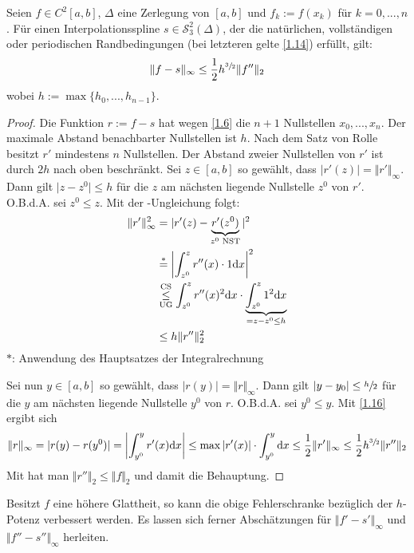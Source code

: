 \begin{proposition}
	Seien $f\in C^2[a,b]$, $\Delta$ eine Zerlegung von $[a,b]$ und $f_k:=f(x_k)$ für $k=0,...,n$. Für einen Interpolationsspline $s\in\mathcal{S}^2_3(\Delta)$, der die natürlichen, vollständigen oder periodischen Randbedingungen (bei letzteren gelte \cref{1.14}) erfüllt, gilt:
	\begin{align}
		\Vert f-s\Vert_\infty \le \frac{1}{2}h^{\sfrac{3}{2}}\Vert f''\Vert_2\notag
	\end{align}
	wobei $h:=\max\{h_0,...,h_{n-1}\}$.
\end{proposition}
\begin{proof}
	Die Funktion $r:=f-s$ hat wegen \cref{1.6} die $n+1$ Nullstellen $x_0,...,x_n$. Der maximale Abstand benachbarter Nullstellen ist $h$. Nach dem Satz von Rolle besitzt $r'$ mindestens $n$ Nullstellen. Der Abstand zweier Nullstellen von $r'$ ist durch $2h$ nach oben beschränkt. Sei $z\in [a,b]$ so gewählt, dass $\vert r'(z)\vert=\Vert r'\Vert_\infty$. Dann gilt $\vert z-z^0\vert\le h$ für die $z$ am nächsten liegende Nullstelle $z^0$ von $r'$. O.B.d.A. sei $z^0\le z$. Mit der -Ungleichung folgt:
	\begin{align}
		\label{1.16}
		\begin{split}
		\Vert r'\Vert_\infty^2 &= \vert r'(z)-\underbrace{r'(z^0)}_{z^0\text{ NST}}\vert^2 \\
		&\overset{\ast}{=} \left|\int_{z^0}^z r''(x)\cdot 1\mathrm{d} x\right|^2  \\
		&\overset{\tiny{\text{CS}}}{\underset{\tiny{\text{UG}}}{\le}} \int_{z^0}^z r''(x)^2\mathrm{d} x\cdot \underbrace{\int_{z^0}^z 1^2\mathrm{d} x}_{=z-z^0\le h} \\
		&\le h\Vert r''\Vert_2^2
		\end{split}
	\end{align}
	$\ast$: Anwendung des Hauptsatzes der Integralrechnung
	
	
	Sei nun $y\in[a,b]$ so gewählt, dass $\vert r(y)\vert=\Vert r\Vert_\infty$. Dann gilt $\vert y-y_0\vert\le \sfrac{h}{2}$ für die $y$ am nächsten liegende Nullstelle $y^0$ von $r$. O.B.d.A. sei $y^0\le y$. Mit \cref{1.16} ergibt sich
	\begin{align}
		\Vert r\Vert_\infty = \vert r(y)-r(y^0)\vert=\left|\int_{y^0}^y r'(x)\mathrm{d} x\right|\le\max\vert r'(x)\vert\cdot \int_{y^0}^y \mathrm{d} x\le \frac{1}{2}\Vert r'\Vert_\infty\le \frac{1}{2}h^{\sfrac{3}{2}}\Vert r''\Vert_2\notag
	\end{align}
	Mit  hat man $\Vert r''\Vert_2\le \Vert f\Vert_2$ und damit die Behauptung.
\end{proof}

\begin{remark}
	Besitzt $f$ eine höhere Glattheit, so kann die obige Fehlerschranke bezüglich der $h$-Potenz verbessert werden. Es lassen sich ferner Abschätzungen für $\Vert f'-s'\Vert_\infty$ und $\Vert f''-s''\Vert_\infty$ herleiten.
\end{remark}